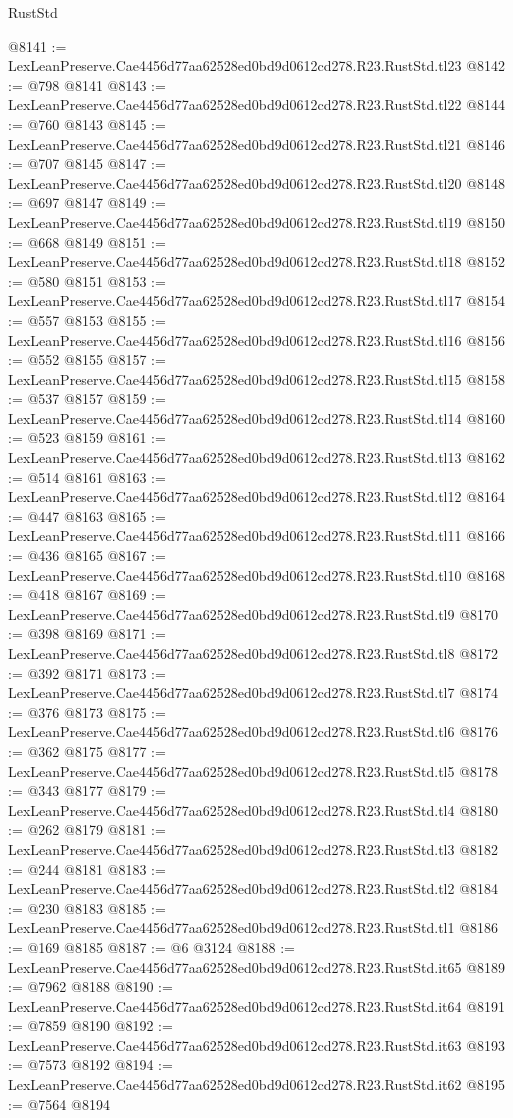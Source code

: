 \begin{lexlean}{RustStd}
\begin{coremodule}
@8141 := LexLeanPreserve.Cae4456d77aa62528ed0bd9d0612cd278.R23.RustStd.tl23
@8142 := @798 @8141
@8143 := LexLeanPreserve.Cae4456d77aa62528ed0bd9d0612cd278.R23.RustStd.tl22
@8144 := @760 @8143
@8145 := LexLeanPreserve.Cae4456d77aa62528ed0bd9d0612cd278.R23.RustStd.tl21
@8146 := @707 @8145
@8147 := LexLeanPreserve.Cae4456d77aa62528ed0bd9d0612cd278.R23.RustStd.tl20
@8148 := @697 @8147
@8149 := LexLeanPreserve.Cae4456d77aa62528ed0bd9d0612cd278.R23.RustStd.tl19
@8150 := @668 @8149
@8151 := LexLeanPreserve.Cae4456d77aa62528ed0bd9d0612cd278.R23.RustStd.tl18
@8152 := @580 @8151
@8153 := LexLeanPreserve.Cae4456d77aa62528ed0bd9d0612cd278.R23.RustStd.tl17
@8154 := @557 @8153
@8155 := LexLeanPreserve.Cae4456d77aa62528ed0bd9d0612cd278.R23.RustStd.tl16
@8156 := @552 @8155
@8157 := LexLeanPreserve.Cae4456d77aa62528ed0bd9d0612cd278.R23.RustStd.tl15
@8158 := @537 @8157
@8159 := LexLeanPreserve.Cae4456d77aa62528ed0bd9d0612cd278.R23.RustStd.tl14
@8160 := @523 @8159
@8161 := LexLeanPreserve.Cae4456d77aa62528ed0bd9d0612cd278.R23.RustStd.tl13
@8162 := @514 @8161
@8163 := LexLeanPreserve.Cae4456d77aa62528ed0bd9d0612cd278.R23.RustStd.tl12
@8164 := @447 @8163
@8165 := LexLeanPreserve.Cae4456d77aa62528ed0bd9d0612cd278.R23.RustStd.tl11
@8166 := @436 @8165
@8167 := LexLeanPreserve.Cae4456d77aa62528ed0bd9d0612cd278.R23.RustStd.tl10
@8168 := @418 @8167
@8169 := LexLeanPreserve.Cae4456d77aa62528ed0bd9d0612cd278.R23.RustStd.tl9
@8170 := @398 @8169
@8171 := LexLeanPreserve.Cae4456d77aa62528ed0bd9d0612cd278.R23.RustStd.tl8
@8172 := @392 @8171
@8173 := LexLeanPreserve.Cae4456d77aa62528ed0bd9d0612cd278.R23.RustStd.tl7
@8174 := @376 @8173
@8175 := LexLeanPreserve.Cae4456d77aa62528ed0bd9d0612cd278.R23.RustStd.tl6
@8176 := @362 @8175
@8177 := LexLeanPreserve.Cae4456d77aa62528ed0bd9d0612cd278.R23.RustStd.tl5
@8178 := @343 @8177
@8179 := LexLeanPreserve.Cae4456d77aa62528ed0bd9d0612cd278.R23.RustStd.tl4
@8180 := @262 @8179
@8181 := LexLeanPreserve.Cae4456d77aa62528ed0bd9d0612cd278.R23.RustStd.tl3
@8182 := @244 @8181
@8183 := LexLeanPreserve.Cae4456d77aa62528ed0bd9d0612cd278.R23.RustStd.tl2
@8184 := @230 @8183
@8185 := LexLeanPreserve.Cae4456d77aa62528ed0bd9d0612cd278.R23.RustStd.tl1
@8186 := @169 @8185
@8187 := @6 @3124
@8188 := LexLeanPreserve.Cae4456d77aa62528ed0bd9d0612cd278.R23.RustStd.it65
@8189 := @7962 @8188
@8190 := LexLeanPreserve.Cae4456d77aa62528ed0bd9d0612cd278.R23.RustStd.it64
@8191 := @7859 @8190
@8192 := LexLeanPreserve.Cae4456d77aa62528ed0bd9d0612cd278.R23.RustStd.it63
@8193 := @7573 @8192
@8194 := LexLeanPreserve.Cae4456d77aa62528ed0bd9d0612cd278.R23.RustStd.it62
@8195 := @7564 @8194

\end{coremodule}
\end{lexlean}
